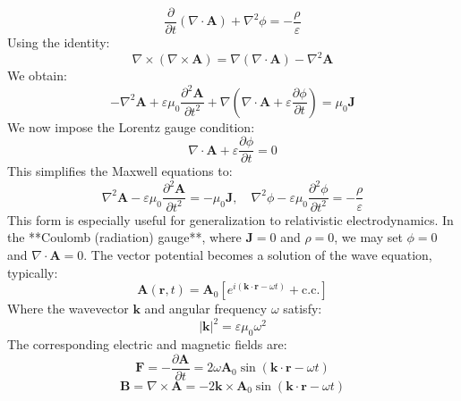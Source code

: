 \begin{equation}
	\frac{\partial}{\partial t}(\nabla \cdot \mathbf{A}) + \nabla^2 \phi = -\frac{\rho}{\varepsilon}
\end{equation}
Using the identity:
\begin{equation}
	\nabla \times (\nabla \times \mathbf{A}) = \nabla (\nabla \cdot \mathbf{A}) - \nabla^2 \mathbf{A}
\end{equation}
We obtain:
\begin{equation}
	-\nabla^2 \mathbf{A} + \varepsilon \mu_0 \frac{\partial^2 \mathbf{A}}{\partial t^2} + \nabla \left( \nabla \cdot \mathbf{A} + \varepsilon \frac{\partial \phi}{\partial t} \right) = \mu_0 \mathbf{J}
\end{equation}
We now impose the Lorentz gauge condition:
\begin{equation}
	\nabla \cdot \mathbf{A} + \varepsilon \frac{\partial \phi}{\partial t} = 0
\end{equation}
This simplifies the Maxwell equations to:
\begin{equation}
	\nabla^2 \mathbf{A} - \varepsilon \mu_0 \frac{\partial^2 \mathbf{A}}{\partial t^2} = -\mu_0 \mathbf{J}, \quad
	\nabla^2 \phi - \varepsilon \mu_0 \frac{\partial^2 \phi}{\partial t^2} = -\frac{\rho}{\varepsilon}
\end{equation}
This form is especially useful for generalization to relativistic electrodynamics. In the **Coulomb (radiation) gauge**, where \( \mathbf{J} = 0 \) and \( \rho = 0 \), we may set \( \phi = 0 \) and \( \nabla \cdot \mathbf{A} = 0 \). The vector potential becomes a solution of the wave equation, typically:
\begin{equation}
	\mathbf{A}(\mathbf{r}, t) = \mathbf{A}_0 \left[ e^{i(\mathbf{k} \cdot \mathbf{r} - \omega t)} + \text{c.c.} \right]
\end{equation}
Where the wavevector \( \mathbf{k} \) and angular frequency \( \omega \) satisfy:
\begin{equation}
	|\mathbf{k}|^2 = \varepsilon \mu_0 \omega^2
\end{equation}
The corresponding electric and magnetic fields are:
\begin{equation}
	\mathbf{F} = -\frac{\partial \mathbf{A}}{\partial t} = 2\omega \mathbf{A}_0 \sin(\mathbf{k} \cdot \mathbf{r} - \omega t)
\end{equation}
\begin{equation}
	\mathbf{B} = \nabla \times \mathbf{A} = - 2\mathbf{k} \times \mathbf{A}_0 \sin(\mathbf{k} \cdot \mathbf{r} - \omega t)
\end{equation}
